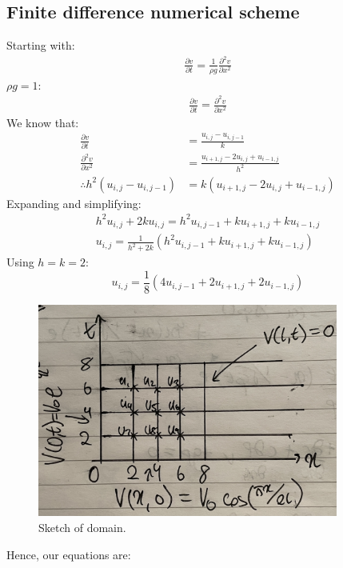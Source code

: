 \documentclass[11pt]{article}
\numberwithin{equation}{section}
\begin{document}
\subsection{Finite difference numerical scheme}
Starting with:
\begin{gather}
    \frac{\partial v}{\partial t} = \frac{1}{\rho g}\frac{\partial^2 v}{\partial x^2}
\end{gather}
$\rho g = 1$:
\begin{gather}
    \frac{\partial v}{\partial t} = \frac{\partial^2 v}{\partial x^2}
\end{gather}
We know that:
\begin{align}
    \frac{\partial v}{\partial t} &= \frac{u_{i,j}-u_{i,j-1}}{k}\\
    \frac{\partial^2 v}{\partial x^2} &= \frac{u_{i+1,j} -2u_{i,j} + u_{i-1,j}}{h^2}\\
    \therefore h^2 \left(u_{i,j} - u_{i,j-1}\right) &= k \left( u_{i+1,j} - 2u_{i,j} + u_{i-1,j} \right)
\end{align}
Expanding and simplifying:
\begin{gather}
    h^2 u_{i,j} + 2k u_{i,j} = h^2 u_{i,j-1} + k u_{i+1,j} + k u_{i-1,j}\\
    u_{i,j} = \frac{1}{h^2 +2k} \left(h^2 u_{i,j-1} + k u_{i+1,j} + k u_{i-1,j}\right)
\end{gather}
Using $h = k = 2$:
\begin{equation}
    u_{i,j} = \frac{1}{8} \left(4 u_{i,j-1} + 2 u_{i+1,j} + 2 u_{i-1,j}\right)
\end{equation}
\begin{figure}[H]
    \centering
    \includegraphics[height = 7cm]{./img/q105a.jpg}
    \caption{Sketch of domain.}
    \label{fig:q105a}
\end{figure}
Hence, our equations are:
\end{document}
